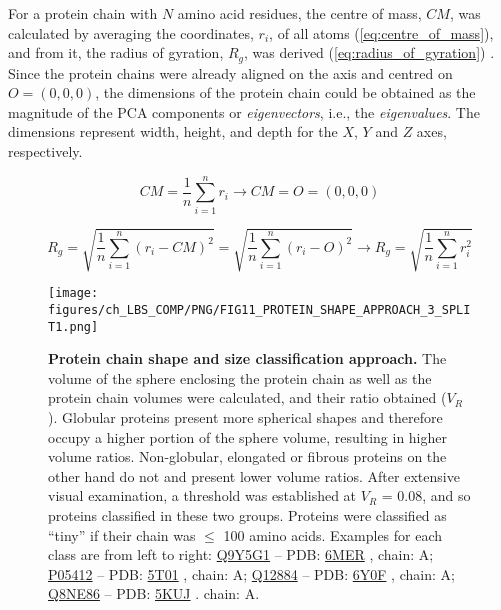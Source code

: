 For a protein chain with $N$ amino acid residues, the centre of mass, $CM$, was calculated by averaging the coordinates, $r_{i}$, of all atoms (\autoref{eq:centre_of_mass}), and from it, the radius of gyration, $R_{g}$, was derived (\autoref{eq:radius_of_gyration}) \cite{FIXMAN_1962_ROG}. Since the protein chains were already aligned on the axis and centred on $O = (0, 0, 0)$, the dimensions of the protein chain could be obtained as the magnitude of the PCA components or \textit{eigenvectors}, i.e., the \textit{eigenvalues}. The dimensions represent width, height, and depth for the $X$, $Y$ and $Z$ axes, respectively.

\begin{equation}
CM = \frac{1}{n} \sum_{i=1}^{n} r_i \rightarrow CM = O = (0,0,0)
\label{eq:centre_of_mass}
\end{equation}

\begin{equation}
R_g = \sqrt{\frac{1}{n} \sum_{i=1}^{n} (r_i - CM)^2} = \sqrt{\frac{1}{n} \sum_{i=1}^{n} (r_i - O)^2} \rightarrow R_g = \sqrt{\frac{1}{n} \sum_{i=1}^{n} r_i^2}
\label{eq:radius_of_gyration}
\end{equation}

\begin{figure}[htb!]
    \centering
    \texttt{[image: figures/ch\_LBS\_COMP/PNG/FIG11\_PROTEIN\_SHAPE\_APPROACH\_3\_SPLIT1.png]}
    \caption[Protein chain shape and size classification approach]{\textbf{Protein chain shape and size classification approach.} The volume of the sphere enclosing the protein chain as well as the protein chain volumes were calculated, and their ratio obtained ($V_R$). Globular proteins present more spherical shapes and therefore occupy a higher portion of the sphere volume, resulting in higher volume ratios. Non-globular, elongated or fibrous proteins on the other hand do not and present lower volume ratios. After extensive visual examination, a threshold was established at $V_R$ = 0.08, and so proteins classified in these two groups. Proteins were classified as ``tiny'' if their chain was $\leq$ 100 amino acids. Examples for each class are from left to right: \href{https://www.uniprot.org/uniprotkb/Q9Y5G1/entry}{Q9Y5G1} -- PDB: \href{https://www.ebi.ac.uk/pdbe/entry/pdb/6mer}{6MER} \cite{NICLOLUDIS_2019_CADH}, chain: A; \href{https://www.uniprot.org/uniprotkb/P05412/entry}{P05412} -- PDB: \href{https://www.ebi.ac.uk/pdbe/entry/pdb/5t01}{5T01} \cite{HONG_2017_EPSTEINBARR}, chain: A; \href{https://www.uniprot.org/uniprotkb/Q12884/entry}{Q12884} -- PDB: \href{https://www.ebi.ac.uk/pdbe/entry/pdb/6Y0F}{6Y0F} \cite{PDB_6Y0F}, chain: A; \href{https://www.uniprot.org/uniprotkb/Q8NE86/entry}{Q8NE86} -- PDB: \href{https://www.ebi.ac.uk/pdbe/entry/pdb/5KUJ}{5KUJ} \cite{LEE_2016_CALCIUM}. chain: A.}
    \label{fig:protein_class_approach}
\end{figure}

